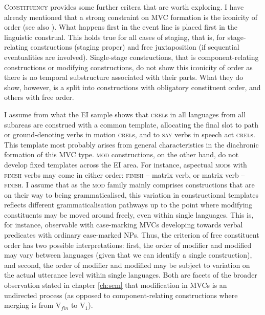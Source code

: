 \textsc{Constituency} provides some further critera that are worth exploring. I have already mentioned that a strong constraint on MVC formation is the iconicity of order (see also \citealt{vanstaden2008serial}). What happens first in the event line is placed first in the linguistic construal. This holds true for all cases of staging, that is, for stage-relating constructions (staging proper) and free juxtaposition (if sequential eventualities are involved). Single-stage constructions, that is component-relating constructions or modifying constructions, do not show this iconicity of order as there is no temporal substructure associated with their parts. What they do show, however, is a split into constructions with obligatory constituent order, and others with free order. 

I assume from what the EI sample shows that \textsc{crel}s in all languages from all subareas are construed with a common template, allocating the final slot to path or ground-denoting verbs in motion \textsc{crel}s, and to \textsc{say} verbs in speech act \textsc{crel}s. This template most probably arises from general characteristics in the diachronic formation of this MVC type. \textsc{mod} constructions, on the other hand, do not develop fixed templates across the EI area. For instance, aspectual \textsc{mod}s with \textsc{finish} verbs may come in either order: \textsc{finish} -- matrix verb, or matrix verb -- \textsc{finish}. I assume that as the \textsc{mod} family mainly comprises constructions that are on their way to being grammaticalised, this variation in constructional templates reflects different grammaticalisation pathways up to the point where modifying constituents may be moved around freely, even within single languages. This is, for instance, observable with case-marking MVCs developing towards verbal predicates with ordinary case-marked NPs. Thus, the criterion of free constituent order has two possible interpretations: first, the order of modifier and modified may vary between languages (given that we can identify a single construction), and second, the order of modifier and modified may be subject to variation on the actual utterance level within single languages. Both are facets of the broader observation stated in chapter \ref{ch:sem} that modification in MVCs is an undirected process (as opposed to component-relating constructions where merging is from V$_{fin}$ to V$_1$).

